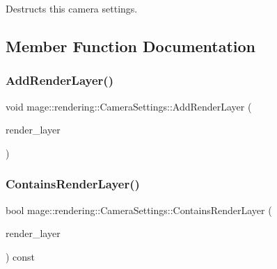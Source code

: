 Destructs this camera settings. 

\subsection{Member Function Documentation}
\hypertarget{classmage_1_1rendering_1_1_camera_settings_a921ff9ebe3ff05890f0e3dd8b71fcb7f}{}\label{classmage_1_1rendering_1_1_camera_settings_a921ff9ebe3ff05890f0e3dd8b71fcb7f} 
\subsubsection{\texorpdfstring{Add\+Render\+Layer()}{AddRenderLayer()}}
{\footnotesize\ttfamily void mage\+::rendering\+::\+Camera\+Settings\+::\+Add\+Render\+Layer (\begin{DoxyParamCaption}\item[{\hyperlink{namespacemage_1_1rendering_a466c2a441ea5b26e4625c2f34e021b3d}{Render\+Layer}}]{render\+\_\+layer }\end{DoxyParamCaption})\hspace{0.3cm}{\ttfamily [noexcept]}}

\hypertarget{classmage_1_1rendering_1_1_camera_settings_aab59f8b20a5d05fd23fff006ef741dac}{}\label{classmage_1_1rendering_1_1_camera_settings_aab59f8b20a5d05fd23fff006ef741dac} 
\subsubsection{\texorpdfstring{Contains\+Render\+Layer()}{ContainsRenderLayer()}}
{\footnotesize\ttfamily bool mage\+::rendering\+::\+Camera\+Settings\+::\+Contains\+Render\+Layer (\begin{DoxyParamCaption}\item[{\hyperlink{namespacemage_1_1rendering_a466c2a441ea5b26e4625c2f34e021b3d}{Render\+Layer}}]{render\+\_\+layer }\end{DoxyParamCaption}) const\hspace{0.3cm}{\ttfamily [noexcept]}}

